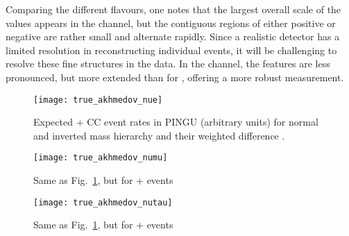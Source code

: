 Comparing the different flavours, one notes that the largest overall scale of 
the
\delchi values appears in the \numu channel, but the contiguous regions of
either positive or negative \delchi are rather small and alternate rapidly.
Since a realistic detector has a limited resolution in reconstructing individual
events, it will be challenging to resolve these fine structures in the data. In
the \nue channel, the features are less pronounced, but more extended than for
\numu, offering a more robust measurement.

\begin{figure}[p]
 \centering
 \texttt{[image: true\_akhmedov\_nue]}
 \caption{Expected \nue + \nuebar CC event rates in PINGU (arbitrary units) for
    normal and inverted mass hierarchy and their weighted difference \delchi.}
 \label{fig:true_akhmedov_nue}
\end{figure}
\begin{figure}[p]
 \centering
 \texttt{[image: true\_akhmedov\_numu]}
 \caption{Same as Fig.~\ref{fig:true_akhmedov_nue}, but for \numu + \numubar
    events}
 \label{fig:true_akhmedov_numu}
\end{figure}
\begin{figure}[p]
 \centering
 \texttt{[image: true\_akhmedov\_nutau]}
 \caption{Same as Fig.~\ref{fig:true_akhmedov_nue}, but for \nutau + \nutaubar
    events}
 \label{fig:true_akhmedov_nutau}
\end{figure}

